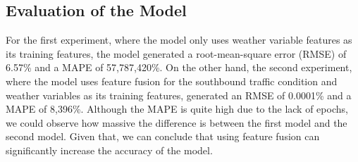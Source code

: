 \subsection{Evaluation of the Model}
For the first experiment, where the model only uses weather variable features as its training features, the model generated a root-mean-square error (RMSE) of 6.57\% and a MAPE of 57,787,420\%. On the other hand, the second experiment, where the model uses feature fusion for the southbound traffic condition and weather variables as its training features, generated an RMSE of 0.0001\% and a MAPE of 8,396\%. Although the MAPE is quite high due to the lack of epochs, we could observe how massive the difference is between the first model and the second model. Given that, we can conclude that using feature fusion can significantly increase the accuracy of the model.
